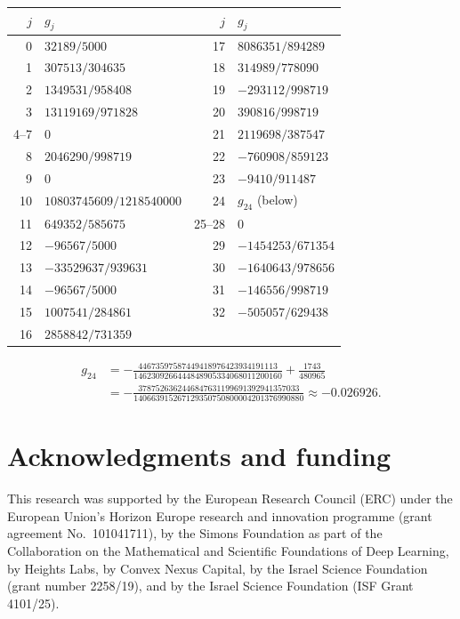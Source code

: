 \documentclass[11pt]{amsart}
\theoremstyle{definition}
\theoremstyle{remark}
\begin{document}
\begin{center}\small
\begin{tabular}{rl@{\qquad}rl}
\toprule
$j$ & $g_j$ & $j$ & $g_j$\\
\midrule
0 & $32189/5000$ & 17 & $8086351/894289$\\
1 & $307513/304635$ & 18 & $314989/778090$\\
2 & $1349531/958408$ & 19 & $-293112/998719$\\
3 & $13119169/971828$ & 20 & $390816/998719$\\
4--7 & $0$ & 21 & $2119698/387547$\\
8 & $2046290/998719$ & 22 & $-760908/859123$\\
9 & $0$ & 23 & $-9410/911487$\\
10 & $10803745609/1218540000$ & 24 & $g_{24}$ (below)\\
11 & $649352/585675$ & 25--28 & $0$\\
12 & $-96567/5000$ & 29 & $-1454253/671354$\\
13 & $-33529637/939631$ & 30 & $-1640643/978656$\\
14 & $-96567/5000$ & 31 & $-146556/998719$\\
15 & $1007541/284861$ & 32 & $-505057/629438$\\
16 & $2858842/731359$ & & \\
\bottomrule
\end{tabular}
\end{center}
\begin{align*}
g_{24}&=-\frac{44673597587449418976423934191113}{1462309266444848905334068011200160}+\frac{1743}{480965}\\
&=-\frac{3787526362446847631199691392941357033}{140663915267129350750800004201376990880}\approx-0.026926 .
\end{align*}

\section*{Acknowledgments and funding}
This research was supported by the European Research Council (ERC) under the European Union's Horizon Europe
research and innovation programme (grant agreement No.~101041711), by the Simons Foundation as part of the
Collaboration on the Mathematical and Scientific Foundations of Deep Learning, by Heights Labs, by Convex Nexus
Capital, by the Israel Science Foundation (grant number 2258/19), and by the Israel Science Foundation (ISF Grant
4101/25).
\end{document}
